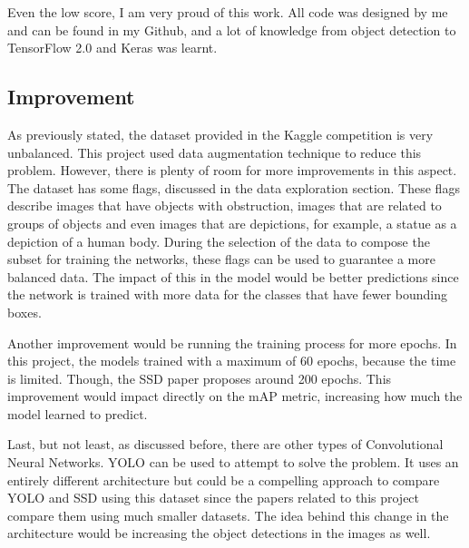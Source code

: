 \documentclass[11pt, a4paper, twocolumn]{article}
\begin{document}
Even the low score, I am very proud of this work. All code was designed by me and can be found in my Github, and a lot of knowledge from object detection to TensorFlow 2.0 and Keras was learnt.

\subsection{Improvement}

As previously stated, the dataset provided in the Kaggle competition is very unbalanced. This project used data augmentation technique to reduce this problem. However, there is plenty of room for more improvements in this aspect. The dataset has some flags, discussed in the data exploration section. These flags describe images that have objects with obstruction, images that are related to groups of objects and even images that are depictions, for example, a statue as a depiction of a human body. During the selection of the data to compose the subset for training the networks, these flags can be used to guarantee a more balanced data. The impact of this in the model would be better predictions since the network is trained with more data for the classes that have fewer bounding boxes.

Another improvement would be running the training process for more epochs. In this project, the models trained with a maximum of 60 epochs, because the time is limited. Though, the SSD paper proposes around 200 epochs. This improvement would impact directly on the mAP metric, increasing how much the model learned to predict.

Last, but not least, as discussed before, there are other types of Convolutional Neural Networks. YOLO can be used to attempt to solve the problem. It uses an entirely different architecture but could be a compelling approach to compare YOLO and SSD using this dataset since the papers related to this project compare them using much smaller datasets. The idea behind this change in the architecture would be increasing the object detections in the images as well.

\clearpage

{}
\end{document}
